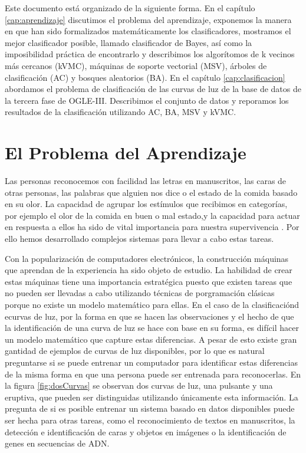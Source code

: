 \documentclass[letterpaper,12pt]{book}
\begin{document}
Este documento está organizado de la siguiente forma. En el capítulo \ref{cap:aprendizaje} discutimos el problema del aprendizaje, exponemos la manera en que han sido formalizados matemáticamente los clasificadores, mostramos el mejor clasificador posible, llamado clasificador de Bayes, así como la imposibilidad práctica de encontrarlo y describimos los algorítomos de k vecinos más cercanos (kVMC), máquinas de soporte vectorial (MSV), árboles de clasificación (AC) y bosques aleatorios (BA). En el capítulo \ref{cap:clasificacion} abordamos el problema de clasificación de las curvas de luz de la base de datos de la tercera fase de OGLE-III. Describimos el conjunto de datos y reporamos los resultados de la clasificación utilizando AC, BA, MSV y kVMC.


\chapter{El Problema del Aprendizaje \label{cap:aprendizaje}}


Las personas reconocemos con facilidad las letras en manuscritos, las caras de otras personas, las palabras que alguien nos dice o el estado de la comida basado en su olor. La capacidad de agrupar los estímulos que recibimos en categorías, por ejemplo el olor de la comida en buen o mal estado,y la capacidad para actuar en respuesta a ellos ha sido de vital importancia para nuestra supervivencia . Por ello  hemos desarrollado complejos sistemas para llevar a cabo estas tareas. 

Con la popularización de computadores electrónicos, la construcción máquinas que aprendan de la experiencia ha sido objeto de estudio. La habilidad de crear estas máquinas tiene una importancia estratégica puesto que existen tareas que no pueden ser llevadas a cabo utilizando técnicas de porgramación clásicas porque no existe un modelo matemático para ellas. En el caso de la clasificaciónd ecurvas de luz, por la forma en que se hacen las observaciones y el hecho de que la identificación de una curva de luz se hace con base en su forma, es difícil hacer un modelo matemático que capture estas diferencias. A pesar de esto existe gran gantidad de ejemplos de curvas de luz disponibles, por lo que es natural preguntarse si se puede entrenar un computador para identificar estas diferencias de la misma forma en que una persona puede ser entrenada para reconocerlas. En la figura \ref{fig:dosCurvas} se observan dos curvas de luz, una pulsante y una eruptiva, que pueden ser distinguidas utilizando únicamente esta información. La pregunta de si es posible entrenar un sistema basado en datos disponibles puede ser hecha para otras tareas, como el reconocimiento de textos en manuscritos, la detección e identificación de caras y objetos en imágenes o la identificación de genes en secuencias de ADN. 
\end{document}
